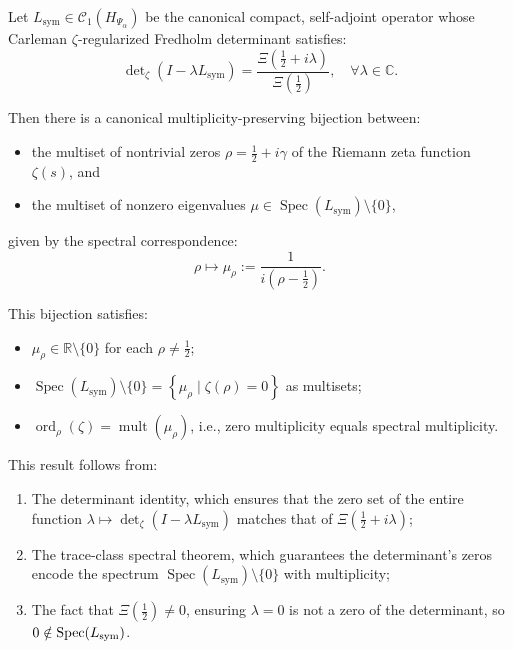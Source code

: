 \begin{theorem}
\label{thm:spectral-zero-bijection-revised}
Let \( L_{\mathrm{sym}} \in \mathcal{C}_1(H_{\Psi_\alpha}) \) be the canonical compact, self-adjoint operator whose Carleman \(\zeta\)-regularized Fredholm determinant satisfies:
\[
\det\nolimits_\zeta(I - \lambda L_{\mathrm{sym}})
= \frac{\Xi\left(\tfrac{1}{2} + i\lambda\right)}{\Xi\left(\tfrac{1}{2}\right)},
\quad \forall \lambda \in \mathbb{C}.
\]

Then there is a canonical multiplicity-preserving bijection between:
\begin{itemize}
  \item the multiset of nontrivial zeros \( \rho = \tfrac{1}{2} + i\gamma \) of the Riemann zeta function \( \zeta(s) \), and
  \item the multiset of nonzero eigenvalues \( \mu \in \operatorname{Spec}(L_{\mathrm{sym}}) \setminus \{0\} \),
\end{itemize}
given by the spectral correspondence:
\[
\rho \mapsto \mu_\rho := \frac{1}{i(\rho - \tfrac{1}{2})}.
\]

\medskip

\noindent
This bijection satisfies:
\begin{itemize}
  \item \( \mu_\rho \in \mathbb{R} \setminus \{0\} \) for each \( \rho \ne \tfrac{1}{2} \);
  \item \( \operatorname{Spec}(L_{\mathrm{sym}}) \setminus \{0\}
  = \left\{ \mu_\rho \mid \zeta(\rho) = 0 \right\} \) as multisets;
  \item \( \operatorname{ord}_\rho(\zeta) = \operatorname{mult}(\mu_\rho) \), i.e., zero multiplicity equals spectral multiplicity.
\end{itemize}

\medskip
\noindent
This result follows from:
\begin{enumerate}
  \item The determinant identity, which ensures that the zero set of the entire function \( \lambda \mapsto \det_\zeta(I - \lambda L_{\mathrm{sym}}) \) matches that of \( \Xi(\tfrac{1}{2} + i\lambda) \);
  \item The trace-class spectral theorem, which guarantees the determinant’s zeros encode the spectrum \( \operatorname{Spec}(L_{\mathrm{sym}}) \setminus \{0\} \) with multiplicity;
  \item The fact that \( \Xi(\tfrac{1}{2}) \ne 0 \), ensuring \( \lambda = 0 \) is not a zero of the determinant, so \( 0 \notin \operatorname{Spec}(L_{\mathrm{sym}}) \).
\end{enumerate}
\end{theorem}
